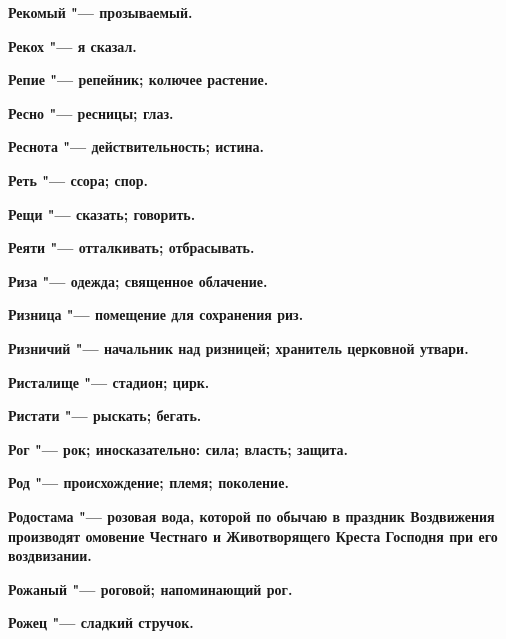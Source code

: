 \begin{mymulticols}{2}
\bfseries Рекомый\normalfont{} "--- прозываемый. 




\bfseries Рекох\normalfont{} "--- я сказал. 




\bfseries Репие\normalfont{} "--- репейник; колючее растение. 




\bfseries Ресно\normalfont{} "--- ресницы; глаз. 




\bfseries Реснота\normalfont{} "--- действительность; истина. 




\bfseries Реть\normalfont{} "--- ссора; спор. 




\bfseries Рещи\normalfont{} "--- сказать; говорить. 




\bfseries Реяти\normalfont{} "--- отталкивать; отбрасывать. 




\bfseries Риза\normalfont{} "--- одежда; священное облачение. 




\bfseries Ризница\normalfont{} "--- помещение для сохранения риз. 




\bfseries Ризничий\normalfont{} "--- начальник над ризницей; хранитель церковной утвари. 




\bfseries Ристалище\normalfont{} "--- стадион; цирк. 




\bfseries Ристати\normalfont{} "--- рыскать; бегать. 




\bfseries Рог\normalfont{} "--- рок; иносказательно: сила; власть; защита. 




\bfseries Род\normalfont{} "--- происхождение; племя; поколение. 




\bfseries Родостама\normalfont{} "--- розовая вода, которой по обычаю в праздник Воздвижения производят омовение Честнаго и Животворящего Креста Господня при его воздвизании. 




\bfseries Рожаный\normalfont{} "--- роговой; напоминающий рог. 




\bfseries Рожец\normalfont{} "--- сладкий стручок. 





\end{mymulticols}
